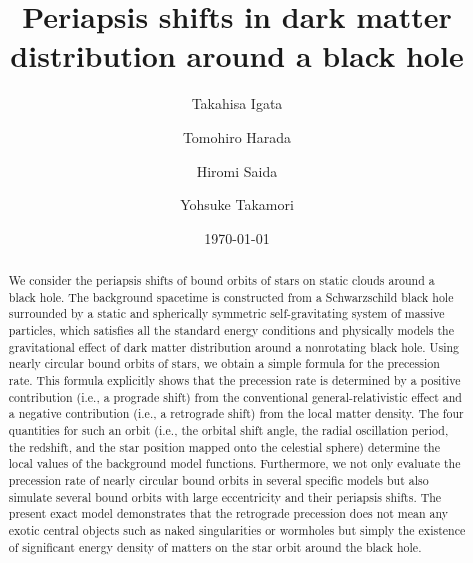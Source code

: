 \documentclass[aps,11pt,nofootinbib,preprintnumbers,groupedaddress,superscriptaddress]{revtex4-2}
\begin{document}
%
\title{
Periapsis shifts in dark matter distribution around a black hole
}
%
\author{Takahisa Igata}
%
\author{Tomohiro Harada}
%
\author{Hiromi Saida}
%
\author{Yohsuke Takamori}
%
\date{\today}


\begin{abstract}
We consider the periapsis shifts of bound orbits of stars
on static clouds around a black hole. The background spacetime is constructed 
from a Schwarzschild black hole surrounded by a static and spherically symmetric self-gravitating system of massive particles, 
which satisfies all the standard energy conditions and physically models the gravitational effect of dark matter 
distribution around a nonrotating black hole.
Using nearly circular bound orbits of stars, we 
obtain a simple formula for the precession rate.
This formula explicitly shows that the precession rate is determined by 
a positive contribution (i.e., a prograde shift) from the conventional general-relativistic effect and a negative contribution (i.e., a retrograde shift) from the local matter density.
The four quantities
for such an orbit (i.e., the orbital shift angle, the radial oscillation period, the redshift, and the star
position mapped onto the celestial sphere) determine the local values of the background model functions.
Furthermore, we not only evaluate the precession rate of nearly circular bound
orbits in several specific models 
but also
simulate several bound
orbits with 
large eccentricity and their 
periapsis shifts. 
The present exact model demonstrates that the retrograde precession does not mean any exotic central objects such as naked singularities or wormholes but simply 
the existence of significant energy density of matters on the star orbit around the black hole. 
\end{abstract}
\maketitle
\end{document}
